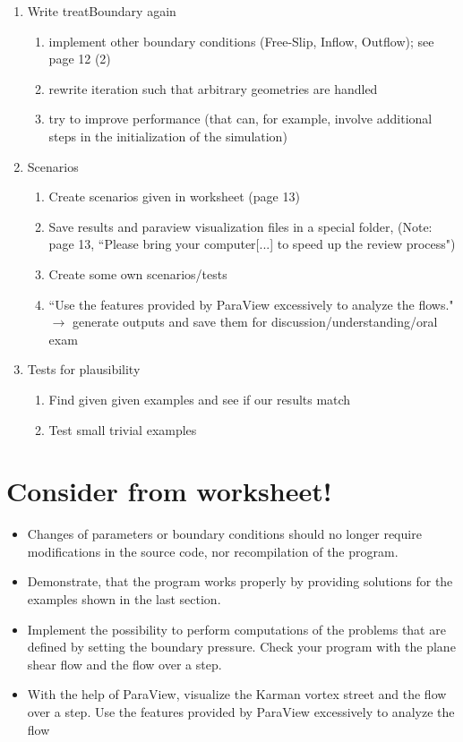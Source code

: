 \documentclass[a4paper]{article}
\newcommand{\qm}[1]{``#1"}							%
\newcommand{\ra}{\rightarrow}						%
\begin{document}
\begin{enumerate}
\item  Write treatBoundary again
\begin{enumerate}
\item implement other boundary conditions (Free-Slip, Inflow, Outflow); see page 12 (2)
\item rewrite iteration such that arbitrary geometries are handled
\item try to improve performance (that can, for example, involve additional steps in the initialization of the simulation)
\end{enumerate}

\item Scenarios
\begin{enumerate}
\item Create scenarios given in worksheet (page 13) 
\item Save results and paraview visualization files in a special folder, (Note: page 13, \qm{Please bring your computer[...] to speed up the review process})
\item Create some own scenarios/tests
\item \qm{Use the features provided by ParaView excessively to analyze the flows.} $ \ra $ generate outputs and save them for discussion/understanding/oral exam 
\end{enumerate}

\item Tests for plausibility
\begin{enumerate}
\item Find given given examples and see if our results match
\item Test small trivial examples
\end{enumerate}

\end{enumerate} 


\section{Consider from worksheet!}
\begin{itemize}
\item Changes of parameters or boundary conditions should no longer require modifications in the source code, nor recompilation of the program.
\item Demonstrate, that the program works properly by providing solutions for the examples shown in the last section.
\item Implement the possibility to perform computations of the problems that are defined by setting the boundary pressure. Check your program with the plane shear flow and the flow over a step.
\item With the help of ParaView, visualize the Karman vortex street and the flow over a step. Use the features provided by ParaView excessively to analyze the flow
\end{itemize}
\end{document}
